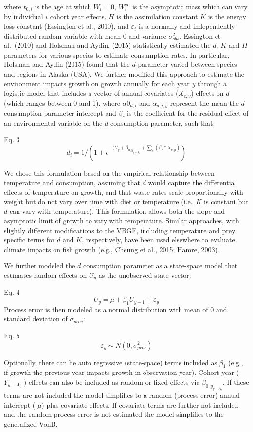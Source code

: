 \documentclass[
]{article}
\begin{document}
where \(t_{0,i}\) is the age at which \(W_{i} = 0\), \(W^{\infty}_{i}\)
is the asymptotic mass which can vary by individual \(i\) cohort year
effects, \(H\) is the assimilation constant \(K\) is the energy loss
constant (Essington et al., 2010), and \(\varepsilon_i\) is a normally
and independently distributed random variable with mean 0 and variance
\(\sigma_{obs}^2\). Essington et al.~(2010) and Holsman and Aydin,
(2015) statistically estimated the \(d\), \(K\) and \(H\) parameters for
various species to estimate consumption rates. In particular, Holsman
and Aydin (2015) found that the \(d\) parameter varied between species
and regions in Alaska (USA). We further modified this approach to
estimate the environment impacts growth on growth annually for each year
\(y\) through a logistic model that includes a vector of annual
covariates (\(X_{c,y}\)) effects on \(d\) (which ranges between 0 and
1). where \(\alpha0_{d,i}\) and \(\alpha_{d,i,y}\) represent the mean
the \(d\) consumption parameter intercept and \(\beta_{c}\) is the
coefficient for the residual effect of an environmental variable on the
\(d\) consumption parameter, such that:

Eq. 3
\[d_{i} = 1/(1+e^{-(U_{y}+\beta_{0,y_{y-A_i}}+\sum_c(\beta_{c}*X_{c,y})}) \]

We chose this formulation based on the empirical relationship between
temperature and consumption, assuming that \(d\) would capture the
differential effects of temperature on growth, and that waste rates
scale proportionally with weight but do not vary over time with diet or
temperature (i.e.~\(K\) is constant but \(d\) can vary with
temperature). This formulation allows both the slope and asymptotic
limit of growth to vary with temperature. Similar approaches, with
slightly different modifications to the VBGF, including temperature and
prey specific terms for \(d\) and \(K\), respectively, have been used
elsewhere to evaluate climate impacts on fish growth (e.g., Cheung et
al., 2015; Hamre, 2003).

We further modeled the \(d\) consumption parameter as a state-space
model that estimates random effects on \(U_{y}\) as the unobserved state
vector:

Eq. 4 \[ U_{y} = \mu+ \beta_{1}U_{y-1}+\varepsilon_y \] Process error is
then modeled as a normal distribution with mean of 0 and standard
deviation of \(\sigma_{proc}\):

Eq. 5 \[ \varepsilon_{y} \sim N(0,\sigma^2_{proc})\]

Optionally, there can be auto regressive (state-space) terms included as
\(\beta_1\) (e.g., if growth the previous year impacts growth in
observation year). Cohort year (\(Y_{y-A_i}\) ) effects can also be
included as random or fixed effects via \(\beta_{0,y_{y-A_i}}\). If
these terms are not included the model simplifies to a random (process
error) annual intercept ( \(\mu\)) plus covariate effects. If covariate
terms are further not included and the random process error is not
estimated the model simplifies to the generalized VonB.
\end{document}
